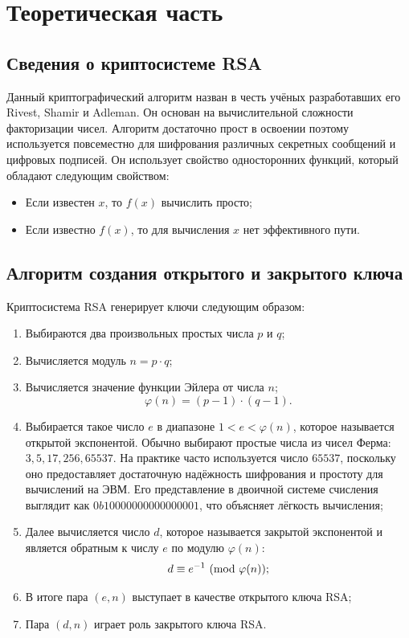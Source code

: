 \section*{Теоретическая часть}

\subsection*{Сведения о криптосистеме RSA}

Данный криптографический алгоритм назван в честь учёных разработавших его Rivest, Shamir и Adleman. Он основан на вычислительной сложности факторизации чисел. Алгоритм достаточно прост в освоении поэтому используется повсеместно для шифрования различных секретных сообщений и цифровых подписей. Он использует свойство односторонних функций, который обладают следующим свойством:
\begin{itemize}
	\item Если известен $x$, то $f(x)$ вычислить просто;
	\item Если известно $f(x)$, то для вычисления $x$ нет эффективного пути.
\end{itemize}

\subsection*{Алгоритм создания открытого и закрытого ключа}

Криптосистема RSA генерирует ключи следующим образом:
\begin{enumerate}
	\item Выбираются два произвольных простых числа $p$ и $q$;
	\item Вычисляется модуль $n=p\cdot q$;
	\item Вычисляется значение функции Эйлера от числа $n$;
	$$
	\varphi(n)=(p-1)\cdot(q-1).
	$$
	\item Выбирается такое число $e$ в диапазоне $1 < e < \varphi(n)$, которое называется открытой экспонентой.
    Обычно выбирают простые числа из чисел Ферма: $3, 5, 17 ,256 ,65537$.
    На практике часто используется число $65537$, поскольку оно предоставляет достаточную надёжность шифрования и простоту для вычислений на ЭВМ.
    Его представление в двоичной системе счисления выглядит как $0b10000000000000001$, что объясняет лёгкость вычисления;
	\item Далее вычисляется число $d$, которое называется закрытой экспонентой и является обратным к числу $e$ по модулю $\varphi(n)$:
	$$
	d \equiv e^{-1} \ (\mathrm{mod}\ \varphi(n));
	$$
	\item В итоге пара $(e,n)$ выступает в качестве открытого ключа RSA;
	\item Пара $(d,n)$ играет роль закрытого ключа RSA.
\end{enumerate}

